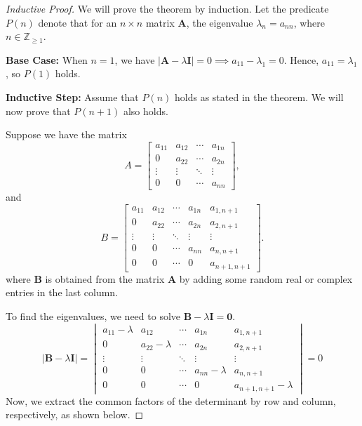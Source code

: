 \documentclass[12pt,a4paper]{article}
\begin{document}
\begin{proof}[Inductive Proof]
We will prove the theorem by induction. Let the predicate \( P(n) \) denote that for an \( n \times n \) matrix \( \mathbf{A} \), the eigenvalue \( \lambda_n = a_{nn} \), where \( n \in \mathbb{Z}_{\geq 1} \).

\textbf{Base Case:}  
When \( n = 1 \), we have \( |\mathbf{A} - \lambda \mathbf{I}| = 0 \implies a_{11} - \lambda_1 = 0 \). Hence, \( a_{11} = \lambda_1 \), so \( P(1) \) holds.

\textbf{Inductive Step:}  
Assume that \( P(n) \) holds as stated in the theorem. We will now prove that \( P(n+1) \) also holds.

Suppose we have the matrix
\[
A = \begin{bmatrix}
a_{11} & a_{12} & \cdots & a_{1n} \\
0 & a_{22} & \cdots & a_{2n} \\
\vdots & \vdots & \ddots & \vdots \\
0 & 0 & \cdots & a_{nn}
\end{bmatrix},
\]
and
\[
B = \begin{bmatrix}
a_{11} & a_{12} & \cdots & a_{1n} & a_{1,n+1} \\
0 & a_{22} & \cdots & a_{2n} & a_{2,n+1} \\
\vdots & \vdots & \ddots & \vdots & \vdots \\
0 & 0 & \cdots & a_{nn} & a_{n,n+1} \\
0 & 0 & \cdots & 0 & a_{n+1,n+1}
\end{bmatrix}.
\]
where \( \mathbf{B} \) is obtained from the matrix \( \mathbf{A} \) by adding some random real or complex entries in the last column.

To find the eigenvalues, we need to solve \( \mathbf{B} - \lambda \mathbf{I} = \mathbf{0} \). 
\[
|\mathbf{B} - \lambda \mathbf{I}| = \begin{vmatrix}
a_{11} - \lambda & a_{12} & \cdots & a_{1n} & a_{1,n+1} \\
0 & a_{22} - \lambda & \cdots & a_{2n} & a_{2,n+1} \\
\vdots & \vdots & \ddots & \vdots & \vdots \\
0 & 0 & \cdots & a_{nn} - \lambda & a_{n,n+1} \\
0 & 0 & \cdots & 0 & a_{n+1,n+1} - \lambda
\end{vmatrix} = 0
\]
Now, we extract the common factors of the determinant by row and column, respectively, as shown below.


\end{proof}
\end{document}
